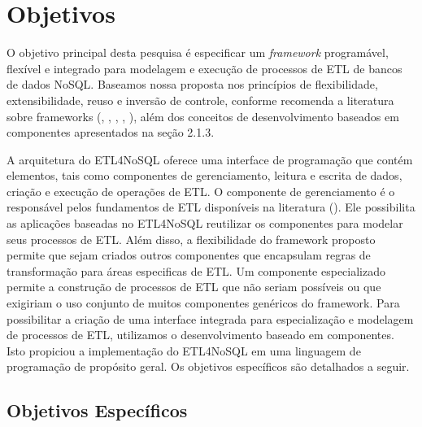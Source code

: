 




\section{Objetivos}

O objetivo principal desta pesquisa é especificar um \textit{framework} programável, flexível e integrado para modelagem e execução de processos de ETL de bancos de dados NoSQL. Baseamos nossa proposta nos princípios de flexibilidade, extensibilidade, reuso e inversão de controle, conforme recomenda a literatura sobre frameworks (\cite{awad:2011}, \cite{vassiliadis:2005}, \cite{fayad:1999}, \cite{fayad:1997}, \cite{darmont:2005}), além dos conceitos de desenvolvimento baseados em componentes apresentados na seção 2.1.3.

A arquitetura do ETL4NoSQL oferece uma interface de programação que contém elementos, tais como componentes de gerenciamento, leitura e escrita de dados, criação e execução de operações de ETL. O componente de gerenciamento é o responsável pelos fundamentos de ETL disponíveis na literatura (\cite{kimball:2004}). Ele possibilita as aplicações baseadas no ETL4NoSQL reutilizar os componentes para modelar seus processos de ETL. Além disso, a flexibilidade do framework proposto permite que sejam criados outros componentes que encapsulam regras de transformação para áreas especificas de ETL. Um componente especializado permite a construção de processos de ETL que não seriam possíveis ou que exigiriam o uso conjunto de muitos componentes genéricos do framework. Para possibilitar a criação de uma interface integrada para especialização e modelagem de processos de ETL, utilizamos o desenvolvimento baseado em componentes. Isto propiciou a implementação do ETL4NoSQL em uma linguagem de programação de propósito geral. Os objetivos específicos são detalhados a seguir.

\subsection{Objetivos Específicos}

